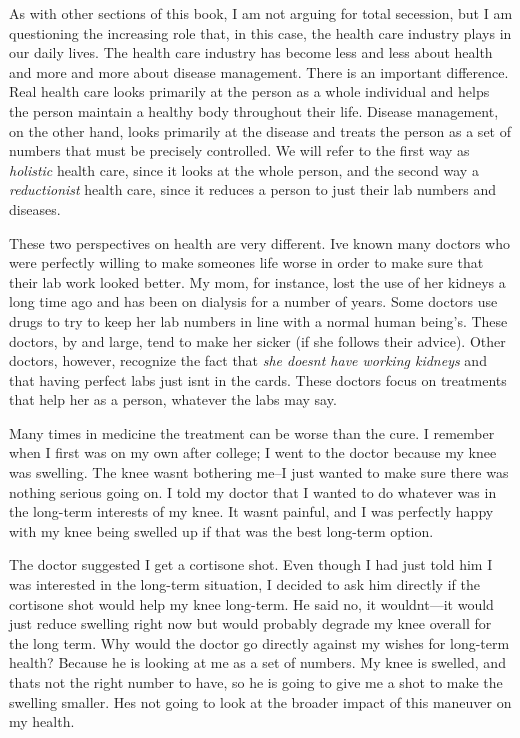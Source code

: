 As with other sections
of this book, I am not arguing for total
secession, but 
I am questioning the
increasing role that,
in this case, the health care industry plays in our daily lives. The
health care industry has become less and less about health and more and
more about disease management. There is an important difference. Real
health care looks primarily at the person as a whole individual and
helps the person maintain a healthy body throughout their life. Disease
management, on the other hand, looks primarily at the disease and
treats the person as a set of numbers that must be precisely
controlled. We will refer to the first way as \textit{holistic} health
care, since it looks at the whole person, and the second way a
\textit{reductionist} health care, since it reduces a person to just
their lab numbers and diseases.

These two perspectives on health are very different.
I{\textquotesingle}ve known many doctors who were perfectly willing to
make someone{\textquotesingle}s life worse in order to make sure that
their lab work looked better. My mom, for instance, lost the use of her
kidneys a long time ago and has been on dialysis for a number of years.
Some doctors use drugs to try to keep her lab numbers in line with a
normal human being’s. These doctors, by and large, tend to make her
sicker (if she follows their advice). Other doctors, however, recognize
the fact that \textit{she doesn{\textquotesingle}t have working
kidneys} and that having perfect labs just isn{\textquotesingle}t in
the cards.  These doctors focus on treatments that help her as a
person, whatever the labs may say.

Many times in medicine the treatment can be worse than the cure. I
remember when I first was on my own after college; I went to the doctor
because my knee was swelling. The knee wasn{\textquotesingle}t
bothering me–I just wanted to make sure there was nothing serious
going on. I told my
doctor that I wanted to do whatever was in the long-term interests of
my knee. It wasn{\textquotesingle}t painful, and I was perfectly happy
with my knee being swelled up if that was the best long-term option. 

The doctor suggested I get a cortisone shot. Even though I had just told
him I was interested in the long-term situation, I decided to ask him
directly if the cortisone shot would help my knee long-term. He said
no, it wouldn{\textquotesingle}t—it would just reduce swelling right
now but would probably degrade my knee overall for the long term. Why
would the doctor go directly against my wishes for long-term health? 
Because he is looking at me as a set of numbers. My knee is swelled,
and that{\textquotesingle}s not the right number to have, so he is
going to give me a shot to make the swelling smaller.
He{\textquotesingle}s not going to look at the broader impact of this
maneuver on my health.

